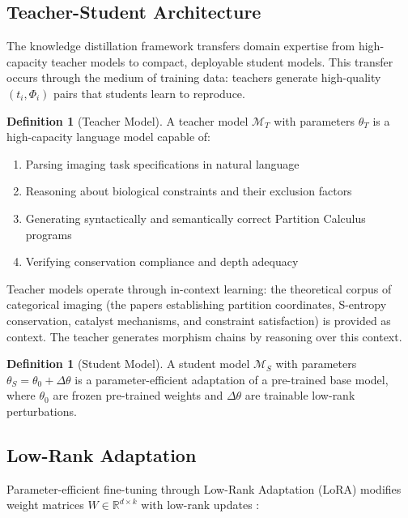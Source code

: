\documentclass[11pt,twocolumn,a4paper]{article}
\theoremstyle{definition}
\newtheorem{definition}[theorem]{Definition}
\theoremstyle{remark}
\newcommand{\R}{\mathbb{R}}
\newcommand{\morphism}{\Phi}
\newcommand{\model}{\mathcal{M}}
\newcommand{\params}{\theta}
\begin{document}
\subsection{Teacher-Student Architecture}

The knowledge distillation framework transfers domain expertise from high-capacity teacher models to compact, deployable student models. This transfer occurs through the medium of training data: teachers generate high-quality $(t_i, \morphism_i)$ pairs that students learn to reproduce.

\begin{definition}[Teacher Model]
\label{def:teacher}
A teacher model $\model_T$ with parameters $\params_T$ is a high-capacity language model capable of:
\begin{enumerate}
    \item Parsing imaging task specifications in natural language
    \item Reasoning about biological constraints and their exclusion factors
    \item Generating syntactically and semantically correct Partition Calculus programs
    \item Verifying conservation compliance and depth adequacy
\end{enumerate}
\end{definition}

Teacher models operate through in-context learning: the theoretical corpus of categorical imaging (the papers establishing partition coordinates, S-entropy conservation, catalyst mechanisms, and constraint satisfaction) is provided as context. The teacher generates morphism chains by reasoning over this context.

\begin{definition}[Student Model]
\label{def:student}
A student model $\model_S$ with parameters $\params_S = \params_0 + \Delta\params$ is a parameter-efficient adaptation of a pre-trained base model, where $\params_0$ are frozen pre-trained weights and $\Delta\params$ are trainable low-rank perturbations.
\end{definition}

\subsection{Low-Rank Adaptation}

Parameter-efficient fine-tuning through Low-Rank Adaptation (LoRA) modifies weight matrices $W \in \R^{d \times k}$ with low-rank updates \cite{Hu2022}:
\end{document}
